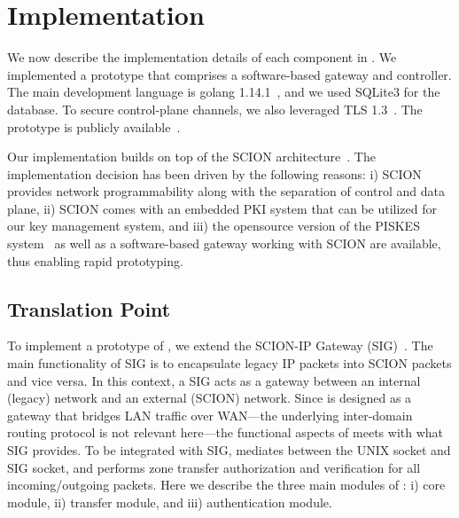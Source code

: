 \chapter{Implementation}
\label{impl}

We now describe the implementation details of each component in \name. 
We implemented a prototype that comprises a software-based gateway and controller.
The main development language is golang 1.14.1~\cite{golang2020}, and we used SQLite3
\cite{sqlite2020} for the database. To secure control-plane channels, we also leveraged 
TLS 1.3~\cite{rfc8446}. The prototype is publicly available~\cite{claude2020code}. 

Our implementation builds on top of the SCION architecture~\cite{Perrig2017}. 
The implementation decision has been driven by the following reasons: i) SCION provides 
network programmability along with the separation of control and data plane, ii) SCION comes 
with an embedded PKI system that can be utilized for our key management system, and 
iii) the opensource version of the PISKES system~\cite{benjamin2020code} as well as a 
software-based gateway working with SCION are available, thus enabling rapid prototyping. 


\section{Translation Point}
\label{sec:tp}

To implement a prototype of \tp, we extend the SCION-IP Gateway (SIG)~\cite{sig2020code}.
The main functionality of SIG is to encapsulate legacy IP packets into SCION packets and 
vice versa. In this context, a SIG acts as a gateway between an internal (legacy) network 
and an external (SCION) network. Since \tp is designed as a gateway that bridges LAN 
traffic over WAN---the underlying inter-domain routing protocol is not relevant here---the 
functional aspects of \tp meets with what SIG provides. To be integrated with SIG, \tp
mediates between the UNIX socket and SIG socket, and performs zone transfer authorization 
and verification for all incoming/outgoing packets. 
Here we describe the three main modules of \tp: i) core module, ii) transfer module, and iii) authentication module. 


